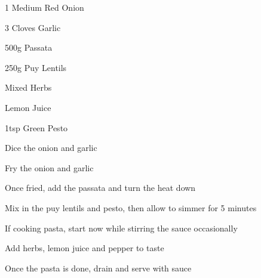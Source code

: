 {
  \item 1 Medium Red Onion
  \item 3 Cloves Garlic
  \item 500g Passata
  \item 250g Puy Lentils
  \item Mixed Herbs
  \item Lemon Juice
  \item 1tsp Green Pesto
}{
  \item Dice the onion and garlic
  \item Fry the onion and garlic
  \item Once fried, add the passata and turn the heat down
  \item Mix in the puy lentils and pesto, then allow to simmer for 5 minutes
  \item If cooking pasta, start now while stirring the sauce occasionally
  \item Add herbs, lemon juice and pepper to taste
  \item Once the pasta is done, drain and serve with sauce
}